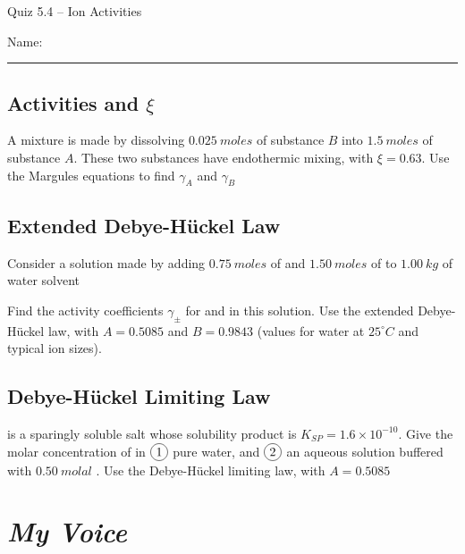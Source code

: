 \documentclass[11pt, letterpaper]{memoir}
\begin{document}
	\begin{center}
		{\large Quiz 5.4 -- Ion Activities}
	\end{center}
	{\large Name: \rule[-1mm]{4in}{.1pt} 
\subsection*{Activities and $\xi$} 
A mixture is made by dissolving $0.025~moles$ of substance $B$ into $1.5~moles$ of substance $A$. These two substances have endothermic mixing, with $\xi=0.63$. Use the Margules equations to find $\gamma_A$ and $\gamma_B$
		
\vspace{10em}
\subsection*{Extended Debye-H\"uckel Law} 
\noindent
Consider a solution made by adding $0.75~moles$ of  and $1.50~moles$ of  to $1.00~kg$ of water solvent

\noindent
Find the activity coefficients $\gamma_{\pm}$ for  and  in this solution. Use the extended Debye-H\"uckel law, with $A=0.5085$ and $B=0.9843$ (values for water at $25^\circ C$ and typical ion sizes).

\vspace{30em}
\subsection*{Debye-H\"uckel Limiting Law}
\noindent
{} is a sparingly soluble salt whose solubility product is $K_{SP}=1.6\times10^{-10}$. Give the molar concentration of  in $\circled{1}$ pure water, and $\circled{2}$ an aqueous solution buffered with $0.50~molal$ . Use the Debye-H\"uckel limiting law, with $A=0.5085$

\newpage
\pagestyle{empty}
\addtocounter{page}{-1}
\section*{\emph{My Voice}}
}
\end{document}
